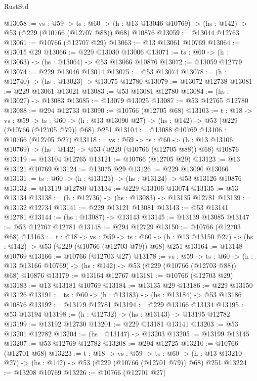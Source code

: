 \begin{lexlean}{RustStd}
\begin{coremodule}
@13058 := {vs : @59} ->
  {ts : @60} ->
  (h : @13 @13046 @10769) -> (hs : @142) -> @53 (@229 (@10766 (@12707 @88)) @68) @10876
@13059 := @13044 @12763
@13061 := @10766 (@12707 @29)
@13063 := @13 @13061 @10769
@13064 := @13015 @29
@13066 := @229 @13030 @13006
@13071 := {ts : @60} -> (h : @13063) -> (hs : @13064) -> @53 @13066 @10876
@13072 := @13059 @12779
@13074 := @229 @13046 @13014
@13075 := @53 @13074
@13078 := (h : @12740) -> (hs : @13023) -> @13075 @12780
@13079 := @13072 @12738
@13081 := @229 @13061 @13021
@13083 := @53 @13081 @12780
@13084 := (hs : @13027) -> @13083
@13085 := @13079 @13025
@13087 := @53 @12765 @12780
@13088 := @294 @12733
@13090 := @10766 (@12705 @68)
@13103 := {t : @18} ->
  {vs : @59} ->
  {ts : @60} -> (h : @13 @13090 @27) -> (hs : @142) -> @53 (@229 (@10766 (@12705 @79)) @68) @251
@13104 := @13088 @10769
@13106 := @10766 (@12705 @27)
@13118 := {vs : @59} ->
  {ts : @60} ->
  (h : @13 @13106 @10769) -> (hs : @142) -> @53 (@229 (@10766 (@12705 @88)) @68) @10876
@13119 := @13104 @12765
@13121 := @10766 (@12705 @29)
@13123 := @13 @13121 @10769
@13124 := @13075 @29
@13126 := @229 @13090 @13066
@13131 := {ts : @60} -> (h : @13123) -> (hs : @13124) -> @53 @13126 @10876
@13132 := @13119 @12780
@13134 := @229 @13106 @13074
@13135 := @53 @13134
@13138 := (h : @12736) -> (hs : @13083) -> @13135 @12781
@13139 := @13132 @12734
@13141 := @229 @13121 @13081
@13143 := @53 @13141 @12781
@13144 := (hs : @13087) -> @13143
@13145 := @13139 @13085
@13147 := @53 @12767 @12781
@13148 := @294 @12729
@13150 := @10766 (@12703 @68)
@13163 := {t : @18} ->
  {vs : @59} ->
  {ts : @60} -> (h : @13 @13150 @27) -> (hs : @142) -> @53 (@229 (@10766 (@12703 @79)) @68) @251
@13164 := @13148 @10769
@13166 := @10766 (@12703 @27)
@13178 := {vs : @59} ->
  {ts : @60} ->
  (h : @13 @13166 @10769) -> (hs : @142) -> @53 (@229 (@10766 (@12703 @88)) @68) @10876
@13179 := @13164 @12767
@13181 := @10766 (@12703 @29)
@13183 := @13 @13181 @10769
@13184 := @13135 @29
@13186 := @229 @13150 @13126
@13191 := {ts : @60} -> (h : @13183) -> (hs : @13184) -> @53 @13186 @10876
@13192 := @13179 @12781
@13194 := @229 @13166 @13134
@13195 := @53 @13194
@13198 := (h : @12732) -> (hs : @13143) -> @13195 @12782
@13199 := @13192 @12730
@13201 := @229 @13181 @13141
@13203 := @53 @13201 @12782
@13204 := (hs : @13147) -> @13203
@13205 := @13199 @13145
@13207 := @53 @12769 @12782
@13208 := @294 @12725
@13210 := @10766 (@12701 @68)
@13223 := {t : @18} ->
  {vs : @59} ->
  {ts : @60} -> (h : @13 @13210 @27) -> (hs : @142) -> @53 (@229 (@10766 (@12701 @79)) @68) @251
@13224 := @13208 @10769
@13226 := @10766 (@12701 @27)

\end{coremodule}
\end{lexlean}
